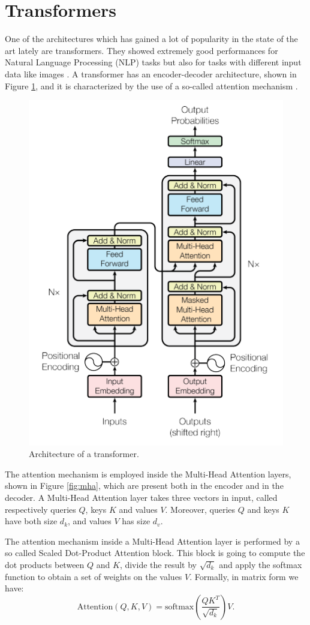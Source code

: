 \documentclass[binding=0.6cm,noexaminfo]{sapthesis}
\begin{document}
\section{Transformers}\label{sec:transformer}

One of the architectures which has gained a lot of popularity in the state of the art lately are transformers. They showed extremely good performances for Natural Language Processing (NLP) tasks but also for tasks with different input data like images \cite{vit}.
A transformer has an encoder-decoder architecture, shown in Figure \ref{fig:transformer}, and it is characterized by the use of a so-called attention mechanism \cite{attention-is-all-you-need}. 

\begin{figure}[h!]
\centering
\includegraphics[width=.6\linewidth]{transformer}
\caption{Architecture of a transformer.}
\label{fig:transformer}
\end{figure}

The attention mechanism is employed inside the Multi-Head Attention layers, shown in Figure \ref{fig:mha}, which are present both in the encoder and in the decoder. A Multi-Head Attention layer takes three vectors in input, called respectively queries $Q$, keys $K$ and values $V$. Moreover, queries $Q$ and keys $K$ have both size $d_k$, and values $V$ has size $d_v$.

The attention mechanism inside a Multi-Head Attention layer is performed by a so called Scaled Dot-Product Attention block. This block is going to compute the dot products between $Q$ and $K$, divide the result by $\sqrt{d_k}$ and apply the softmax function to obtain a set of weights on the values $V$. Formally, in matrix form we have:
\begin{equation}
\text{Attention}(Q, K, V) = \text{softmax} \left( \frac{QK^T}{\sqrt{d_k}} \right) V.
\end{equation}
\end{document}
